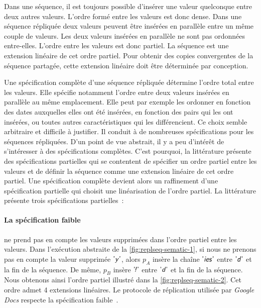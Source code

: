 Dans une séquence, il est toujours possible d'insérer une valeur quelconque entre deux autres valeurs.
L'ordre formé entre les valeurs est donc dense.
Dans une séquence répliquée deux valeurs peuvent être insérées en parallèle entre un même couple de valeurs.
Les deux valeurs insérées en parallèle ne sont pas ordonnées entre-elles.
L'ordre entre les valeurs est donc partiel.
La séquence est une extension linéaire de cet ordre partiel.
Pour obtenir des copies convergentes de la séquence partagée, cette extension linéaire doit être déterminée par conception.

Une spécification complète d'une séquence répliquée détermine l'ordre total entre les valeurs.
Elle spécifie notamment l'ordre entre deux valeurs insérées en parallèle au même emplacement.
Elle peut par exemple les ordonner en fonction des dates auxquelles elles ont été insérées, en fonction des pairs qui les ont insérées, ou toutes autres caractéristiques qui les différencient.
Ce choix semble arbitraire et difficile à justifier.
Il conduit à de nombreuses spécifications pour les séquences répliquées.
D'un point de vue abstrait, il y a peu d'intérêt de s'intéresser à des spécifications complètes.
C'est pourquoi, la littérature présente des spécifications partielles qui se contentent de spécifier un ordre partiel entre les valeurs et de définir la séquence comme une extension linéaire de cet ordre partiel.
Une spécification complète devient alors un raffinement d'une spécification partielle qui choisit une linéarisation de l'ordre partiel.
La littérature présente trois spécifications partielles~:

\paragraph{La spécification faible}\autocite{attiyai_2016_spec-text-editing} ne prend pas en compte les valeurs supprimées dans l'ordre partiel entre les valeurs.
Dans l'exécution abstraite de la \autoref{fig:replseq-sematic-1}, si nous ne prenons pas en compte la valeur supprimée $\textsf{'\textit{y}'}$, alors $p_A$ insère la chaîne $\textsf{'\textit{ies}'}$ entre $\textsf{'\textit{d}'}$ et la fin de la séquence.
De même, $p_B$ insère $\textsf{'\textit{\negthinspace!}'}$ entre $\textsf{'\textit{d}'}$ et la fin de la séquence.
Nous obtenons ainsi l'ordre partiel illustré dans la \autoref{fig:replseq-sematic-2}.
Cet ordre admet 4 extensions linéaires.
Le protocole de réplication utilisée par \emph{Google Docs} respecte la spécification faible~\autocite{wei2018_jupiterweak}.

